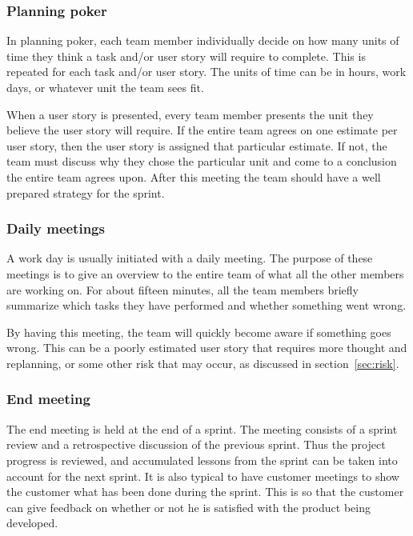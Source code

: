 \subsubsection{Planning poker}
In planning poker, each team member individually decide on how many units of time they think a task and/or user story will require to complete. This is repeated for each task and/or user story. The units of time can be in hours, work days, or whatever unit the team sees fit.

When a user story is presented, every team member presents the unit they believe the user story will require. If the entire team agrees on one estimate per user story, then the user story is assigned that particular estimate. If not, the team must discuss why they chose the particular unit and come to a conclusion the entire team agrees upon.
After this meeting the team should have a well prepared strategy for the sprint.

\subsubsection{Daily meetings}
A work day is usually initiated with a daily meeting. The purpose of these meetings is to give an overview to the entire team of what all the other members are working on. For about fifteen minutes, all the team members briefly summarize which tasks they have performed and whether something went wrong.

By having this meeting, the team will quickly become aware if something goes wrong. This can be a poorly estimated user story that requires more thought and replanning, or some other risk that may occur, as discussed in section~\ref{sec:risk}. 

\subsubsection{End meeting}
The end meeting is held at the end of a sprint. The meeting consists of a sprint review and a retrospective discussion of the previous sprint.
Thus the project progress is reviewed, and accumulated lessons from the sprint can be taken into account for the next sprint.
It is also typical to have customer meetings to show the customer what has been done during the sprint. This is so that the customer can give feedback on whether or not he is satisfied with the product being developed.

